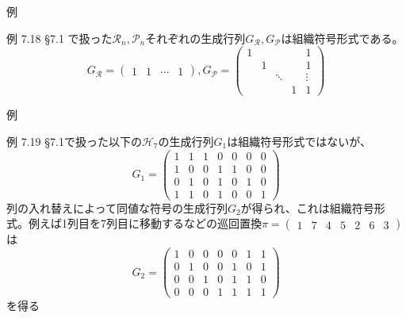 \documentclass[dvipdfmx,10pt,jsarticle]{beamer}
\begin{document}
  \begin{frame}{例}
    \begin{block}{例 7.18}
      \S7.1 で扱った$\mathcal{R}_n, \mathcal{P}_n$それぞれの生成行列$G_{\mathcal{R}}, G_{\mathcal{P}}$は組織符号形式である。
      \[ G_{\mathcal{R}} = \begin{pmatrix}
          1 & 1 & \cdots & 1
       \end{pmatrix}, G_{\mathcal{P}} = \begin{pmatrix}
          1 &   &   &   & 1 \\
            & 1 &   &   & 1 \\
            &   & \ddots &   & \vdots \\
            &   &   & 1 & 1 
          
        \end{pmatrix} \]
    \end{block}
  \end{frame}

  \begin{frame}{例}
    \begin{block}{例 7.19}
      \S7.1で扱った以下の$\mathcal{H}_7$の生成行列$G_1$は組織符号形式ではないが、
      \[ G_1 = \begin{pmatrix}
          1 & 1 & 1 & 0 & 0 & 0 & 0 \\
          1 & 0 & 0 & 1 & 1 & 0 & 0 \\
          0 & 1 & 0 & 1 & 0 & 1 & 0 \\
          1 & 1 & 0 & 1 & 0 & 0 & 1 
    \end{pmatrix} \]
      列の入れ替えによって同値な符号の生成行列$G_2$が得られ、これは組織符号形式。例えば1列目を7列目に移動するなどの巡回置換{\fontsize{8pt}{0pt}$\pi = \begin{pmatrix} 1 & 7 & 4 & 5 & 2 & 6 & 3 \end{pmatrix}$}は
      \[ G_2 = \begin{pmatrix}
          1 & 0 & 0 & 0 & 0 & 1 & 1 \\
          0 & 1 & 0 & 0 & 1 & 0 & 1 \\
          0 & 0 & 1 & 0 & 1 & 1 & 0 \\
          0 & 0 & 0 & 1 & 1 & 1 & 1
    \end{pmatrix} \]
      を得る
    \end{block}
  \end{frame}
\end{document}
